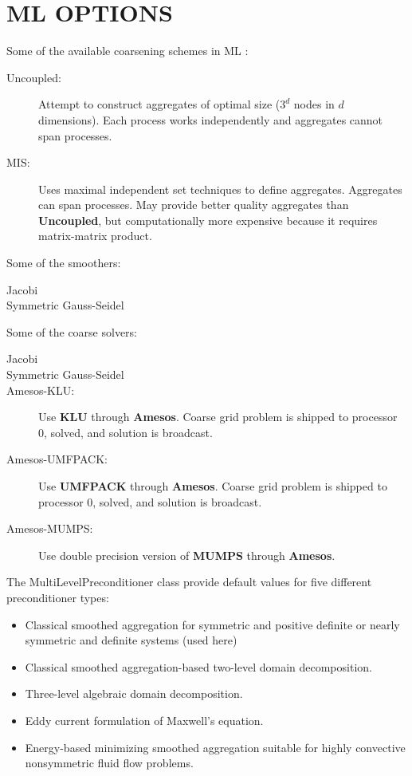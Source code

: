 \chapter{\uppercase{ML options}}

Some of the available coarsening schemes in ML \cite{ml_guide}:
\begin{description}
  \item[Uncoupled:] Attempt to construct aggregates of optimal size ($3^d$
    nodes in $d$ dimensions). Each process works independently and aggregates
    cannot span processes.
  \item[MIS:] Uses maximal independent set techniques to define aggregates.
    Aggregates can span processes. May provide better quality aggregates than
    {\bf Uncoupled}, but computationally more expensive because it requires
    matrix-matrix product.
\end{description}
Some of the smoothers:
\begin{description}
  \item[Jacobi]
  \item[Symmetric Gauss-Seidel]
\end{description}
Some of the coarse solvers:
\begin{description}
  \item[Jacobi]
  \item[Symmetric Gauss-Seidel]
  \item[Amesos-KLU:] Use {\bf KLU} through {\bf Amesos}. Coarse grid problem
    is shipped to processor 0, solved, and solution is broadcast.
  \item[Amesos-UMFPACK:] Use {\bf UMFPACK} through {\bf Amesos}. Coarse grid
    problem is shipped to processor 0, solved, and solution is broadcast.
  \item[Amesos-MUMPS:] Use double precision version of {\bf MUMPS} through
    {\bf Amesos}.
\end{description}
The MultiLevelPreconditioner class provide default values for five different
preconditioner types:
\begin{itemize}
  \item Classical smoothed aggregation for symmetric and positive definite or
    nearly symmetric and definite systems (used here)
  \item Classical smoothed aggregation-based two-level domain decomposition.
  \item Three-level algebraic domain decomposition.
  \item Eddy current formulation of Maxwell's equation.
  \item Energy-based minimizing smoothed aggregation suitable for highly
    convective nonsymmetric fluid flow problems.
\end{itemize}
